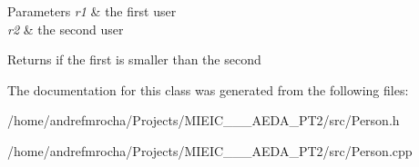 \begin{DoxyParams}{Parameters}
{\em r1} & the first user \\
\hline
{\em r2} & the second user \\
\hline
\end{DoxyParams}
\begin{DoxyReturn}{Returns}
if the first is smaller than the second 
\end{DoxyReturn}


The documentation for this class was generated from the following files\+:\begin{DoxyCompactItemize}
\item 
/home/andrefmrocha/\+Projects/\+M\+I\+E\+I\+C\+\_\+\_\+\_\+\+A\+E\+D\+A\+\_\+\+P\+T2/src/Person.\+h\item 
/home/andrefmrocha/\+Projects/\+M\+I\+E\+I\+C\+\_\+\_\+\_\+\+A\+E\+D\+A\+\_\+\+P\+T2/src/Person.\+cpp\end{DoxyCompactItemize}
